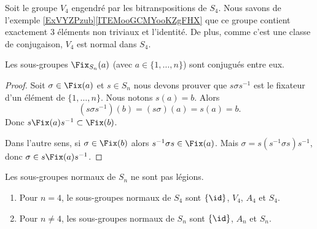 \begin{normaltext}     \label{NORMooQAZTooBQLqDn}
    Soit le groupe \( V_4\) engendré par les bitranspositions de \( S_4\). Nous savons de l'exemple \ref{ExVYZPzub}\ref{ITEMooGCMYooKZgFHX} que ce groupe contient exactement \( 3\) éléments non triviaux et l'identité. De plus, comme c'est une classe de conjugaison, \( V_4\) est normal dans \( S_4\).
\end{normaltext}

\begin{lemma}
    Les sous-groupes \( \Fix_{S_n}(a)\) (avec \( a\in\{ 1,\ldots, n \}\)) sont conjugués entre eux.
\end{lemma}

\begin{proof}
    Soit \( \sigma\in \Fix(a)\) et \( s\in S_n\) nous devons prouver que \( s \sigma s^{-1}\) est le fixateur d'un élément de \( \{ 1,\ldots, n \}\). Nous notons \( s(a)=b\). Alors
    \begin{equation}
        (s\sigma s^{-1})(b)=(s\sigma)(a)=s(a)=b.
    \end{equation}
    Donc \( s\Fix(a)s^{-1}\subset \Fix(b)\).

    Dans l'autre sens, si \( \sigma\in \Fix(b)\) alors \( s^{-1} \sigma s\in\Fix(a)\). Mais \( \sigma=s(s^{-1}\sigma s)s^{-1}\), donc \( \sigma\in s\Fix(a)s^{-1}\).
\end{proof}

\begin{proposition}     \label{PROPooOTJAooUbzGZm}
    Les sous-groupes normaux de \( S_n\) ne sont pas légions.
    \begin{enumerate}
        \item
            Pour \( n=4\), le sous-groupes normaux de \( S_4\) sont \(  \{ \id \}  \), \( V_4\), \( A_4\) et \( S_4\).
        \item
            Pour \( n\neq 4\), les sous-groupes normaux de \( S_n\) sont \( \{ \id \}\), \( A_n\) et \( S_n\).
    \end{enumerate}
\end{proposition}

